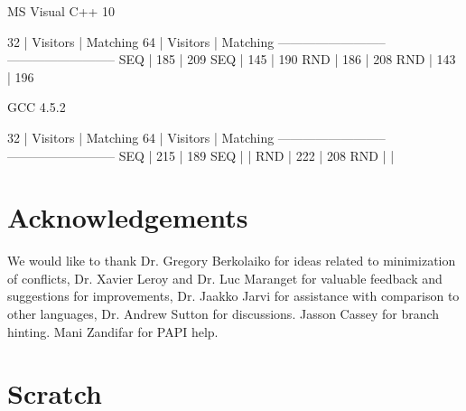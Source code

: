 \documentclass[preprint]{sigplanconf}
\begin{document}
MS Visual C++ 10

 32 | Visitors | Matching      64 | Visitors | Matching 
--------------------------    --------------------------
SEQ |   185    |   209        SEQ |   145    |   190    
RND |   186    |   208        RND |   143    |   196    

GCC 4.5.2

 32 | Visitors | Matching      64 | Visitors | Matching 
--------------------------    --------------------------
SEQ |   215    |   189        SEQ |          |          
RND |   222    |   208        RND |          |          

\section{Acknowledgements} %

We would like to thank Dr. Gregory Berkolaiko for ideas related to minimization 
of conflicts, Dr. Xavier Leroy and Dr. Luc Maranget for valuable feedback and 
suggestions for improvements, Dr. Jaakko Jarvi for assistance with comparison to 
other languages, Dr. Andrew Sutton for discussions. Jasson Cassey for branch 
hinting. Mani Zandifar for PAPI help.

\section{Scratch}
\end{document}
